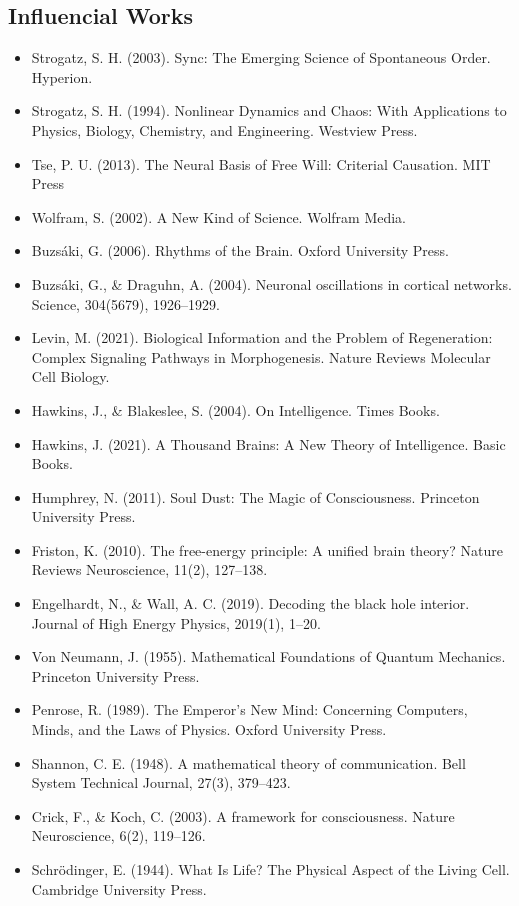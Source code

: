 \subsection{Influencial Works}
\begin{itemize}
\item Strogatz, S. H. (2003). Sync: The Emerging Science of Spontaneous Order. Hyperion.
\item Strogatz, S. H. (1994). Nonlinear Dynamics and Chaos: With Applications to Physics, Biology, Chemistry, and Engineering. Westview Press.
\item Tse, P. U. (2013). The Neural Basis of Free Will: Criterial Causation. MIT Press
\item Wolfram, S. (2002). A New Kind of Science. Wolfram Media.
\item Buzs\'aki, G. (2006). Rhythms of the Brain. Oxford University Press.
\item Buzs\'aki, G., \& Draguhn, A. (2004). Neuronal oscillations in cortical networks. Science, 304(5679), 1926--1929.
\item Levin, M. (2021). Biological Information and the Problem of Regeneration: Complex Signaling Pathways in Morphogenesis. Nature Reviews Molecular Cell Biology.
\item Hawkins, J., \& Blakeslee, S. (2004). On Intelligence. Times Books.
\item Hawkins, J. (2021). A Thousand Brains: A New Theory of Intelligence. Basic Books.
\item Humphrey, N. (2011). Soul Dust: The Magic of Consciousness. Princeton University Press.
\item Friston, K. (2010). The free-energy principle: A unified brain theory? Nature Reviews Neuroscience, 11(2), 127--138.
\item Engelhardt, N., \& Wall, A. C. (2019). Decoding the black hole interior. Journal of High Energy Physics, 2019(1), 1--20.
\item Von Neumann, J. (1955). Mathematical Foundations of Quantum Mechanics. Princeton University Press.
\item Penrose, R. (1989). The Emperor's New Mind: Concerning Computers, Minds, and the Laws of Physics. Oxford University Press.
\item Shannon, C. E. (1948). A mathematical theory of communication. Bell System Technical Journal, 27(3), 379--423.
\item Crick, F., \& Koch, C. (2003). A framework for consciousness. Nature Neuroscience, 6(2), 119--126.
\item Schr\"odinger, E. (1944). What Is Life? The Physical Aspect of the Living Cell. Cambridge University Press.

\end{itemize}
